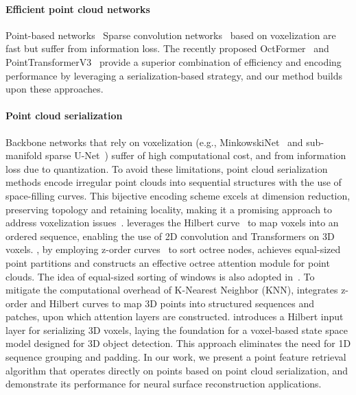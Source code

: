 \paragraph{Efficient point cloud networks}
Point-based networks~\cite{PointNet,hu2019randla} 
Sparse convolution networks~\cite{choy20194d,graham20183d} based on voxelization are fast but suffer from information loss. 
The recently proposed OctFormer~\cite{wang2023octformer} and PointTransformerV3~\cite{wu2024point} provide a superior combination of efficiency and encoding performance by leveraging a serialization-based strategy, and our method builds upon these approaches.

\paragraph{Point cloud serialization}
Backbone networks that rely on voxelization (e.g., MinkowskiNet~\cite{choy20194d} and sub-manifold sparse U-Net~\cite{graham20183d}) suffer of high computational cost, and from information loss due to quantization.
To avoid these limitations, point cloud serialization methods encode irregular point clouds into sequential structures with the use of space-filling curves.
This bijective encoding scheme excels at dimension reduction, preserving topology and retaining locality, making it a promising approach to address voxelization issues~\cite{wang2005space, wang2017cnn}.
\citet{chen2022efficient} leverages the Hilbert curve~\cite{hilbert1935stetige} to map voxels into an ordered sequence, enabling the use of 2D convolution and Transformers on 3D voxels.
\citet{wang2023octformer}, by employing z-order curves~\cite{morton1966computer} to sort octree nodes, achieves equal-sized point partitions and constructs an effective octree attention module for point clouds.
The idea of equal-sized sorting of windows is also adopted in~\cite{liu2023flatformer}.
To mitigate the computational overhead of K-Nearest Neighbor (KNN), \citet{wu2024point} integrates z-order and Hilbert curves to map 3D points into structured sequences and patches, upon which attention layers are constructed.
\citet{zhang2024voxel} introduces a Hilbert input layer for serializing 3D voxels, laying the foundation for a voxel-based state space model designed for 3D object detection.
This approach eliminates the need for 1D sequence grouping and padding.
\quad 
In our work, we present a point feature retrieval algorithm that operates directly on points based on point cloud serialization, and demonstrate its performance for neural surface reconstruction applications.











